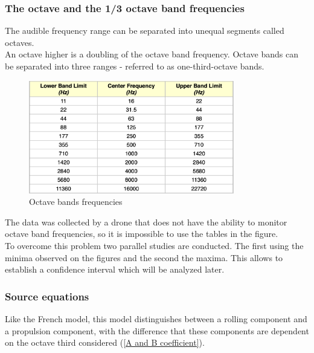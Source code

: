 \documentclass{article}
\begin{document}
{\color{red}\subsubsection{The octave and the 1/3 octave band frequencies}

\noindent The audible frequency range can be separated into unequal segments called octaves. \\

\noindent An octave higher is a doubling of the octave band frequency. Octave bands can be separated into three ranges - referred to as one-third-octave bands.

\begin{figure}[H]
    \begin{center}
        \includegraphics[width=0.8\textwidth]{IMAGINE/octave_band.png}
        \caption{Octave bands frequencies}
        \label{Octave bands frequencies}
    \end{center}
\end{figure}

\noindent The data was collected by a drone that does not have the ability to monitor octave band frequencies, so it is impossible to use the tables in the figure. \\
To overcome this problem two parallel studies are conducted. The first using the minima observed on the figures and the second the maxima. This allows to establish a confidence interval which will be analyzed later. }

\subsubsection{Source equations}

Like the French model, this model distinguishes between a rolling component and a propulsion component, with the difference that these components are dependent on the octave third considered (\ref{A and B coefficient}). \\
\end{document}
